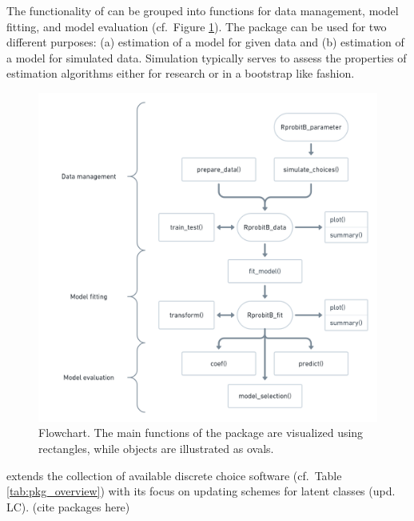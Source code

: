 \documentclass[article]{jss}
\begin{document}
The functionality of  can be grouped into functions for data management, model fitting, and model evaluation (cf.\ Figure \ref{fig:flowchart}). The package can be used for two different purposes: (a) estimation of a model for given data and (b) estimation of a model for simulated data. Simulation typically serves to assess the properties of estimation algorithms either for research or in a bootstrap like fashion.

\begin{figure}[t!]
  \includegraphics{flowchart.png}
  \caption{Flowchart. The main functions of the  package are visualized using rectangles, while objects are illustrated as ovals.}
  \label{fig:flowchart}
\end{figure}

 extends the collection of available discrete choice software (cf.\ Table \ref{tab:pkg_overview}) with its focus on updating schemes for latent classes (upd. LC). (cite packages here)
\end{document}
